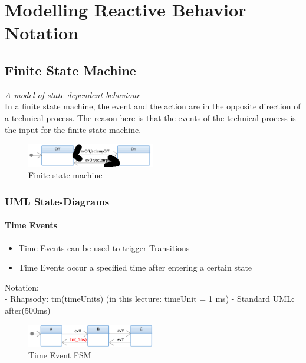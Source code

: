 \hypertarget{modelling-reactive-behavior-notation}{%
\section{Modelling Reactive Behavior
Notation}\label{modelling-reactive-behavior-notation}}

\hypertarget{finite-state-machine}{%
\subsection{Finite State Machine}\label{finite-state-machine}}

\emph{A model of state dependent behaviour}\\
In a finite state machine, the event and the action are in the opposite
direction of a technical process. The reason here is that the events of
the technical process is the input for the finite state machine.

\begin{figure}[H]
\centering
\includegraphics[width=0.5\textwidth]{figures/fsm.png}
\caption{Finite state machine}
\end{figure}

\hypertarget{uml-state-diagrams}{%
\subsubsection{UML State-Diagrams}\label{uml-state-diagrams}}

\hypertarget{time-events}{%
\paragraph{Time Events}\label{time-events}}

\begin{itemize}
\tightlist
\item
  Time Events can be used to trigger Transitions
\item
  Time Events occur a specified time after entering a certain state
\end{itemize}

Notation:\\
- Rhapsody: tm(timeUnits) (in this lecture: timeUnit = 1 ms) - Standard
UML: after(500ms)

\begin{figure}[H]
\centering
\includegraphics[width=0.5\textwidth]{figures/fsmTimeEvent.png}
\caption{Time Event FSM}
\end{figure}

